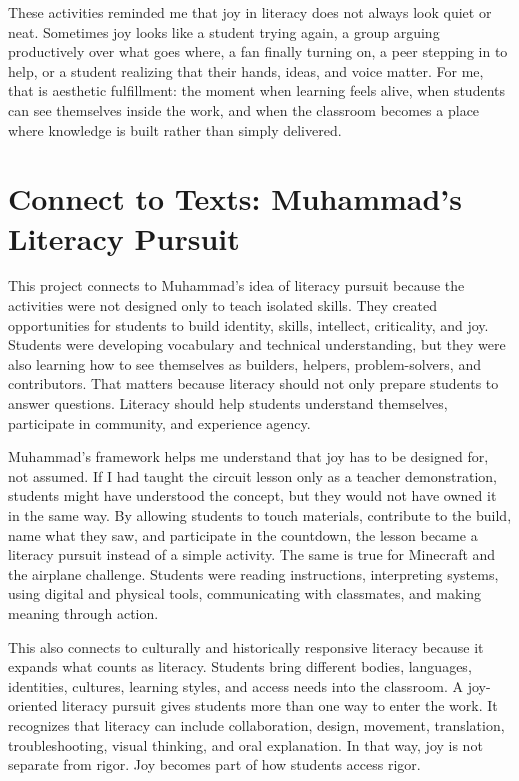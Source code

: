\documentclass[12pt]{article}
\begin{document}
These activities reminded me that joy in literacy does not always look quiet or neat. Sometimes joy looks like a student trying again, a group arguing productively over what goes where, a fan finally turning on, a peer stepping in to help, or a student realizing that their hands, ideas, and voice matter. For me, that is aesthetic fulfillment: the moment when learning feels alive, when students can see themselves inside the work, and when the classroom becomes a place where knowledge is built rather than simply delivered.

\section*{Connect to Texts: Muhammad's Literacy Pursuit}

This project connects to Muhammad's idea of literacy pursuit because the activities were not designed only to teach isolated skills. They created opportunities for students to build identity, skills, intellect, criticality, and joy. Students were developing vocabulary and technical understanding, but they were also learning how to see themselves as builders, helpers, problem-solvers, and contributors. That matters because literacy should not only prepare students to answer questions. Literacy should help students understand themselves, participate in community, and experience agency.

Muhammad's framework helps me understand that joy has to be designed for, not assumed. If I had taught the circuit lesson only as a teacher demonstration, students might have understood the concept, but they would not have owned it in the same way. By allowing students to touch materials, contribute to the build, name what they saw, and participate in the countdown, the lesson became a literacy pursuit instead of a simple activity. The same is true for Minecraft and the airplane challenge. Students were reading instructions, interpreting systems, using digital and physical tools, communicating with classmates, and making meaning through action.

This also connects to culturally and historically responsive literacy because it expands what counts as literacy. Students bring different bodies, languages, identities, cultures, learning styles, and access needs into the classroom. A joy-oriented literacy pursuit gives students more than one way to enter the work. It recognizes that literacy can include collaboration, design, movement, translation, troubleshooting, visual thinking, and oral explanation. In that way, joy is not separate from rigor. Joy becomes part of how students access rigor.
\end{document}
